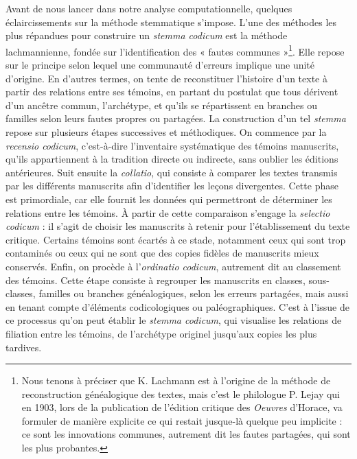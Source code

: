 \documentclass[a4paper,twoside,12pt]{book}
\begin{document}
Avant de nous lancer dans notre analyse computationnelle, quelques éclaircissements sur la méthode stemmatique s'impose. L’une des méthodes les plus répandues pour construire un \textit{stemma codicum} est la méthode lachmannienne, fondée sur l’identification des « fautes communes »\footnote{Nous tenons à préciser que K. Lachmann est à l'origine de la méthode de reconstruction généalogique des textes, mais c'est le philologue P. Lejay qui en 1903, lors de la publication de l'édition critique des \textit{Oeuvres} d'Horace, va formuler de manière explicite ce qui restait jusque-là quelque peu implicite : ce sont les innovations communes, autrement dit les fautes partagées, qui sont les plus probantes.}. Elle repose sur le principe selon lequel une communauté d’erreurs implique une unité d’origine. En d’autres termes, on tente de reconstituer l’histoire d'un texte à partir des relations entre ses témoins, en partant du postulat que tous dérivent d’un ancêtre commun, l’archétype, et qu’ils se répartissent en branches ou familles selon leurs fautes propres ou partagées.
La construction d’un tel \textit{stemma} repose sur plusieurs étapes successives et méthodiques. On commence par la \textit{recensio codicum}, c’est-à-dire l’inventaire systématique des témoins manuscrits, qu’ils appartiennent à la tradition directe ou indirecte, sans oublier les éditions antérieures.
Suit ensuite la \textit{collatio}, qui consiste à comparer les textes transmis par les différents manuscrits afin d’identifier  les leçons divergentes. Cette phase est primordiale, car elle fournit les données qui permettront de déterminer les relations entre les témoins.
À partir de cette comparaison s’engage la \textit{selectio codicum} : il s’agit de choisir les manuscrits à retenir pour l’établissement du texte critique. Certains témoins sont écartés à ce stade, notamment ceux qui sont trop contaminés ou ceux qui ne sont que des copies fidèles de manuscrits mieux conservés.
Enfin, on procède à l’\textit{ordinatio codicum}, autrement dit au classement des témoins. Cette étape consiste à regrouper les manuscrits en classes, sous-classes, familles ou branches généalogiques, selon les erreurs partagées, mais aussi en tenant compte d’éléments codicologiques ou paléographiques. C’est à l’issue de ce processus qu’on peut établir le \textit{stemma codicum}, qui visualise les relations de filiation entre les témoins, de l’archétype originel jusqu’aux copies les plus tardives.
\end{document}
